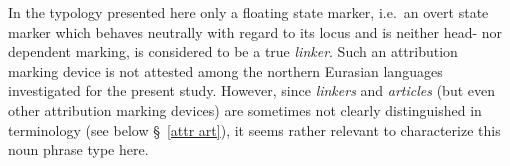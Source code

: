 In the typology presented here only a floating state marker, i.e.~an overt state marker which behaves neutrally with regard to its locus and is neither head- nor dependent marking, is considered to be a true \emph{linker}. Such an attribution marking device is not attested among the northern Eurasian languages investigated for the present study. However, since \emph{linkers} and \emph{articles} (but even other attribution marking devices) are sometimes not clearly distinguished in terminology (see below \S~\ref{attr art}), it seems rather relevant to characterize this noun phrase type here.

